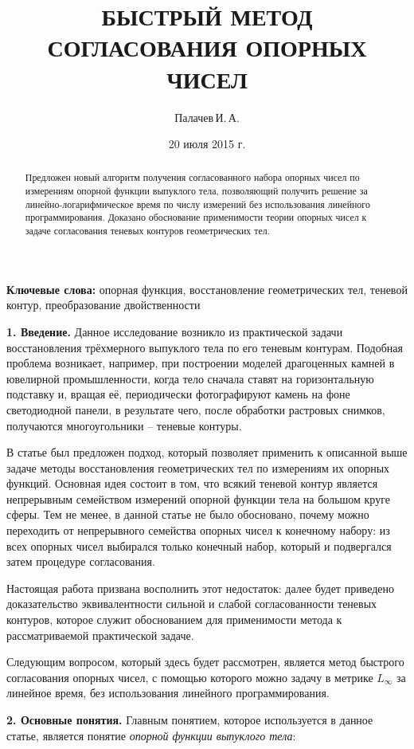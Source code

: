 \documentclass[a4paper, 10pt]{article}
\title{БЫСТРЫЙ МЕТОД СОГЛАСОВАНИЯ ОПОРНЫХ ЧИСЕЛ}
\author{Палачев\,И.\,А.}
\date{20 июля 2015 г.}
\theoremstyle{definition}
\theoremstyle{plain}
\theoremstyle{plain}
\begin{document}
\maketitle

\begin{abstract}
Предложен новый алгоритм получения согласованного набора опорных чисел по
измерениям опорной функции выпуклого тела, позволяющий получить решение за
линейно-логарифмическое время по числу измерений без использования линейного
программирования. Доказано обоснование применимости теории опорных чисел к
задаче согласования теневых контуров геометрических тел.
\end{abstract}

\textbf{Ключевые слова:} опорная функция, восстановление геометрических тел,
теневой контур, преобразование двойственности

\textbf{1. Введение.}
Данное исследование возникло из практической задачи восстановления трёхмерного
выпуклого тела по его теневым контурам. Подобная проблема возникает, например,
при построении моделей драгоценных камней в ювелирной промышленности, когда
тело сначала ставят на горизонтальную подставку и, вращая её, периодически
фотографируют камень на фоне светодиодной панели, в результате чего, после
обработки растровых снимков, получаются многоугольники -- теневые контуры.

В статье \cite{palachev} был предложен подход, который позволяет применить к
описанной выше задаче методы восстановления геометрических тел по измерениям их
опорных функций. Основная идея состоит в том, что всякий теневой контур является
непрерывным семейством измерений опорной функции тела на большом круге сферы.
Тем не менее, в данной статье не было обосновано, почему можно переходить от
непрерывного семейства опорных чисел к конечному набору: из всех опорных чисел
выбирался только конечный набор, который и подвергался затем процедуре
согласования.

Настоящая работа призвана восполнить этот недостаток: далее будет приведено
доказательство эквивалентности сильной и слабой согласованности теневых
контуров, которое служит обоснованием для применимости метода к рассматриваемой
практической задаче.

Следующим вопросом, который здесь будет рассмотрен, является метод быстрого
согласования опорных чисел, с помощью которого можно задачу в метрике
$L_{\infty}$ за линейное время, без использования линейного программирования.

\textbf{2. Основные понятия.}
Главным понятием, которое используется в данное статье, является понятие
\textit{опорной функции выпуклого тела}:
\end{document}
